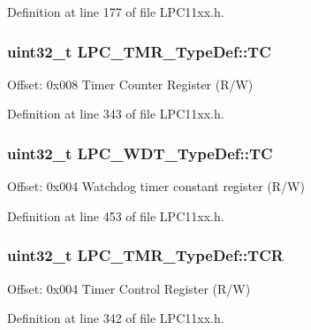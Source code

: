 Definition at line 177 of file L\+P\+C11xx.\+h.

\subsubsection[{\texorpdfstring{TC}{TC}}]{ uint32\+\_\+t L\+P\+C\+\_\+\+T\+M\+R\+\_\+\+Type\+Def\+::\+TC}\hypertarget{group___l_p_c11xx___definitions_ga2a69dc7f40533cd8d997a6ddf5b02db3}{}\label{group___l_p_c11xx___definitions_ga2a69dc7f40533cd8d997a6ddf5b02db3}
Offset\+: 0x008 Timer Counter Register (R/W) 

Definition at line 343 of file L\+P\+C11xx.\+h.

\subsubsection[{\texorpdfstring{TC}{TC}}]{ uint32\+\_\+t L\+P\+C\+\_\+\+W\+D\+T\+\_\+\+Type\+Def\+::\+TC}\hypertarget{group___l_p_c11xx___definitions_gac88d8aa857d093999d12de4a3d97065f}{}\label{group___l_p_c11xx___definitions_gac88d8aa857d093999d12de4a3d97065f}
Offset\+: 0x004 Watchdog timer constant register (R/W) 

Definition at line 453 of file L\+P\+C11xx.\+h.

\subsubsection[{\texorpdfstring{T\+CR}{TCR}}]{ uint32\+\_\+t L\+P\+C\+\_\+\+T\+M\+R\+\_\+\+Type\+Def\+::\+T\+CR}\hypertarget{group___l_p_c11xx___definitions_ga01eb339565185250e0451be2c008082b}{}\label{group___l_p_c11xx___definitions_ga01eb339565185250e0451be2c008082b}
Offset\+: 0x004 Timer Control Register (R/W) 

Definition at line 342 of file L\+P\+C11xx.\+h.

